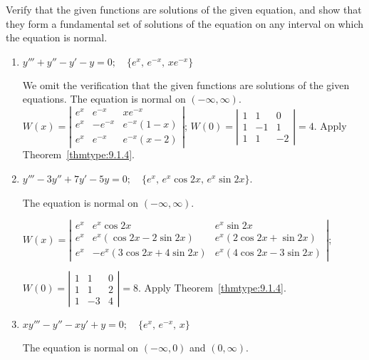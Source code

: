 \documentclass{ximera}
\begin{document}
\begin{problem}\label{exer:9.1.6}
Verify that the given functions are solutions of the given equation, and show that they  form a fundamental set of solutions of the
equation on any interval on which the equation is normal.

\begin{enumerate}
     
\item $y'''+y''-y'-y=0;  \quad\{e^x,\,e^{-x},\,xe^{-x}\}$

\begin{solution}
We omit the verification that the given functions are solutions of the
given equations.  The equation is normal on $(-\infty,\infty)$.
$W(x)=\left|\begin{array}{cccc}e^x&e^{-x}&xe^{-x}\\
e^x&-e^{-x}&e^{-x}(1-x)\\e^x&e^{-x}&e^{-x}
(x-2)\end{array}\right|$;
$W(0)=
\left|\begin{array}{cccc}1&1&0\\1&-1&1\\1&1&-2\end{array}\right|=4$.
Apply  Theorem~\ref{thmtype:9.1.4}.
\end{solution}

\item $y'''-3y''+7y'-5y=0;  \quad\{e^x,\,e^x\cos2x,\,e^x\sin2x\}$.

\begin{solution}
The equation is normal on $(-\infty,\infty)$.

$W(x)=
\left|\begin{array}{cccc}e^x&e^x\cos 2x&e^x\sin 2x\\
e^x&e^x(\cos 2x-2\sin 2x)&e^x(2\cos2x
+\sin 2x)\\e^x&-e^x(3\cos 2x+4\sin 2x)&e^x(4\cos 2x-3\sin2x
)\end{array}\right|$;

$W(0)=
\left|\begin{array}{cccc}1&1&0\\1&1&2\\1&-3&4\end{array}\right|
=8$. Apply Theorem~\ref{thmtype:9.1.4}.
\end{solution}

\item $xy'''-y''-xy'+y=0;  \quad \{e^x,\,e^{-x},\,x\}$

\begin{solution}
The equation is normal on $(-\infty,0)$ and $(0,\infty)$.


\end{solution}
\end{enumerate}
\end{problem}
\end{document}
